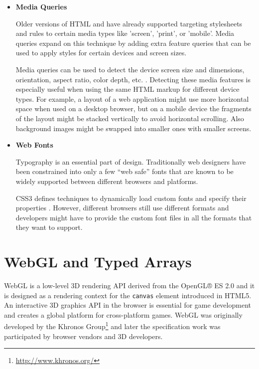 \begin{itemize}
\item \textbf{Media Queries}

  Older versions of HTML and  have already supported targeting
  stylesheets and rules to certain media types like 'screen', 'print',
  or 'mobile'. Media queries expand on this technique by adding extra
  feature queries that can be used to apply styles for certain devices
  and screen sizes. \cite{mediaqueries}

  Media queries can be used to detect the device screen size and
  dimensions, orientation, aspect ratio, color depth,
  etc. \cite{mediaqueries}. Detecting these media features is especially
  useful when using the same HTML markup for different device types. For
  example, a layout of a web application might use more horizontal space
  when used on a desktop browser, but on a mobile device the fragments
  of the layout might be stacked vertically to avoid horizontal
  scrolling. Also background images might be swapped into smaller ones
  with smaller screens.

\item \textbf{Web Fonts}

  Typography is an essential part of design. Traditionally web designers
  have been constrained into only a few ``web safe'' fonts that are
  known to be widely supported between different browsers and platforms.

  CSS3 defines techniques to dynamically load custom fonts and specify
  their properties \cite{cssfonts}. However, different browsers still
  use different formats and developers might have to provide the custom
  font files in all the formats that they want to support.

\end{itemize}

\section{WebGL and Typed Arrays}

WebGL is a low-level 3D rendering API derived from the OpenGL® ES 2.0
\cite{OpenGL} and it is designed as a rendering context for the
\texttt{canvas} element introduced in HTML5. An interactive 3D
graphics API in the browser is essential for game development and
creates a global platform for cross-platform games. WebGL was
originally developed by the Khronos
Group\footnote{\url{http://www.khronos.org/}} and later the
specification work was participated by browser vendors and 3D
developers. \cite{WebGL}

